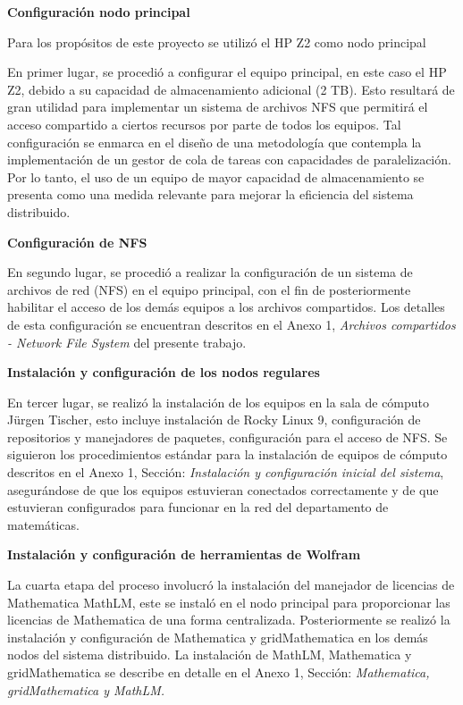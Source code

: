 \begin{spacing}{1.5}
  \textbf{Configuración nodo principal}

  Para los propósitos de este proyecto se utilizó el HP Z2 como nodo principal

  En primer lugar, se procedió a configurar el equipo principal, en este caso el HP Z2, debido a su capacidad de almacenamiento adicional (2 TB). Esto resultará de gran utilidad para implementar un sistema de archivos NFS que permitirá el acceso compartido a ciertos recursos por parte de todos los equipos. Tal configuración se enmarca en el diseño de una metodología que contempla la implementación de un gestor de cola de tareas con capacidades de paralelización. Por lo tanto, el uso de un equipo de mayor capacidad de almacenamiento se presenta como una medida relevante para mejorar la eficiencia del sistema distribuido.

  \textbf{Configuración de NFS}

  En segundo lugar, se procedió a realizar la configuración de un sistema de archivos de red (NFS) en el equipo principal, con el fin de posteriormente  habilitar el acceso de los demás equipos a los archivos compartidos. Los detalles de esta configuración se encuentran descritos en el Anexo 1, \textit{Archivos compartidos - Network File System} del presente trabajo.

  \textbf{Instalación y configuración de los nodos regulares}

  En tercer lugar, se realizó la instalación de los equipos en la sala de cómputo Jürgen Tischer, esto incluye instalación de Rocky Linux 9, configuración de repositorios y manejadores de paquetes, configuración para el acceso de NFS. Se siguieron los procedimientos estándar para la instalación de equipos de cómputo descritos en el Anexo 1, Sección: \textit{Instalación y configuración inicial del sistema}, asegurándose de que los equipos estuvieran conectados correctamente y de que estuvieran configurados para funcionar en la red del departamento de matemáticas.

  \textbf{Instalación y configuración de herramientas de Wolfram}

  La cuarta etapa del proceso involucró la instalación del manejador de licencias de Mathematica MathLM, este se instaló en el nodo principal para proporcionar las licencias de Mathematica de una forma centralizada. Posteriormente se realizó la instalación y configuración de Mathematica y gridMathematica en los demás nodos del sistema distribuido. La instalación de MathLM, Mathematica y gridMathematica se describe en detalle en el Anexo 1, Sección: \textit{Mathematica, gridMathematica y MathLM.}


\end{spacing}
